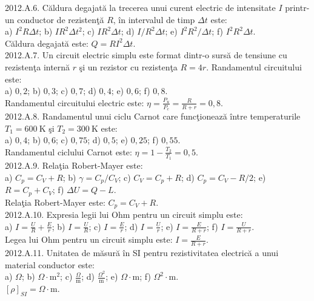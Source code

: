 2012.A.6. Căldura degajată la trecerea unui curent electric de intensitate $I$ printr-un conductor de rezistenţă $R$, în intervalul de timp $\Delta t$ este:\\ a) $I^{2} R \Delta t$; b) $I R^{2} \Delta t^{2}$; c) $I R^{2} \Delta t$; d) $I / R^{2} \Delta t$; e) $I^{2} R^{2} / \Delta t$; f) $I^{2} R^{2} \Delta t$.\\ Căldura degajată este: $Q=R I^{2} \Delta t$.\\

2012.A.7. Un circuit electric simplu este format dintr-o sursă de tensiune cu rezistenţa internă $r$ şi un rezistor cu rezistenţa $R=4 r$. Randamentul circuitului este:\\ a) $0,2$; b) $0,3$; c) $0,7$; d) $0,4$; e) $0,6$; f) $0,8$.\\ Randamentul circuitului electric este: $\eta=\frac{P_{u}}{P_{c}}=\frac{R}{R+r}=0,8$.\\

2012.A.8. Randamentul unui ciclu Carnot care funcţionează între temperaturile $T_{1}=600 \mathrm{~K}$ şi $T_{2}=300 \mathrm{~K}$ este:\\ a) $0,4$; b) $0,6$; c) $0,75$; d) $0,5$; e) $0,25$; f) $0,55$.\\ Randamentul ciclului Carnot este: $\eta=1-\frac{T_{2}}{T_{1}}=0,5$.\\

2012.A.9. Relaţia Robert-Mayer este:\\ a) $C_{p}=C_{V}+R$; b) $\gamma=C_{p} / C_{V}$; c) $C_{V}=C_{p}+R$; d) $C_{p}=C_{V}-R / 2$; e) $R=C_{p}+C_{V}$; f) $\Delta U=Q-L$.\\ Relaţia Robert-Mayer este: $C_{p}=C_{V}+R$.\\

2012.A.10. Expresia legii lui Ohm pentru un circuit simplu este:\\ a) $I=\frac{U}{R}+\frac{E}{r}$; b) $I=\frac{U}{R}$; c) $I=\frac{E}{r}$; d) $I=\frac{U}{r}$; e) $I=\frac{E}{R+r}$; f) $I=\frac{U}{R+r}$.\\ Legea lui Ohm pentru un circuit simplu este: $I=\frac{E}{R+r}$.\\

2012.A.11. Unitatea de măsură în SI pentru rezistivitatea electrică a unui material conductor este:\\ a) $\Omega$; b) $\Omega \cdot \mathrm{m}^{2}$; c) $\frac{\Omega}{\mathrm{m}}$; d) $\frac{\Omega^{2}}{\mathrm{m}}$; e) $\Omega \cdot \mathrm{m}$; f) $\Omega^{2} \cdot \mathrm{m}$.\\ $[\rho]_{S I}=\Omega \cdot \mathrm{m}$.\\

